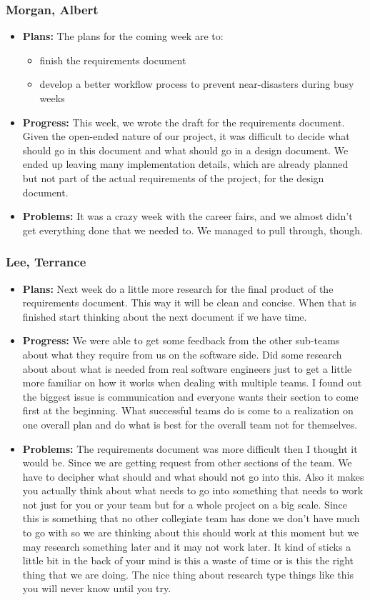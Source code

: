 \documentclass[10pt,draftclsnofoot,onecolumn]{IEEEtran}
\begin{document}
\subsubsection{Morgan, Albert}
\begin{itemize}
	\item \textbf{Plans: }
	The plans for the coming week are to:
	\begin{itemize}
		\item finish the requirements document
		\item develop a better workflow process to prevent near-disasters during busy weeks
	\end{itemize}
	\item \textbf{Progress: }
	This week, we wrote the draft for the requirements document. Given the open-ended nature of our project, it was difficult to decide what should go in this document and what should go in a design document. We ended up leaving many implementation details, which are already planned but not part of the actual requirements of the project, for the design document.
	\item \textbf{Problems: }
	It was a crazy week with the career fairs, and we almost didn't get everything done that we needed to. We managed to pull through, though.
\end{itemize}
\subsubsection{Lee, Terrance}
\begin{itemize}
	\item \textbf{Plans: }
	Next week do a little more research for the final product of the requirements document. This way it will be clean and concise. When that is finished start thinking about the next document if we have time.
	\item \textbf{Progress: }
	We were able to get some feedback from the other sub-teams about what they require from us on the software side. Did some research about about what is needed from real software engineers just to get a little more familiar on how it works when dealing with multiple teams. I found out the biggest issue is communication and everyone wants their section to come first at the beginning. What successful teams do is come to a realization on one overall plan and do what is best for the overall team not for themselves.
	\item \textbf{Problems: }
	The requirements document was more difficult then I thought it would be. Since we are getting request from other sections of the team. We have to decipher what should and what should not go into this. Also it makes you actually think about what needs to go into something that needs to work not just for you or your team but for a whole project on a big scale. Since this is something that no other collegiate team has done we don't have much to go with so we are thinking about this should work at this moment but we may research something later and it may not work later. It kind of sticks a little bit in the back of your mind is this a waste of time or is this the right thing that we are doing. The nice thing about research type things like this you will never know until you try.
\end{itemize}
\end{document}
